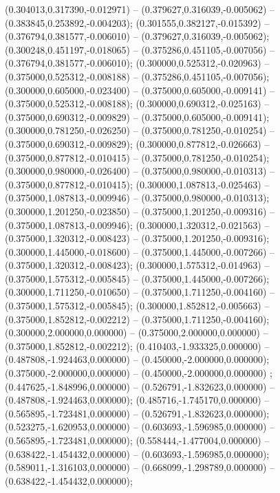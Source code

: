  (0.304013,0.317390,-0.012971) -- (0.379627,0.316039,-0.005062) -- (0.383845,0.253892,-0.004203);
 (0.301555,0.382127,-0.015392) -- (0.376794,0.381577,-0.006010) -- (0.379627,0.316039,-0.005062);
 (0.300248,0.451197,-0.018065) -- (0.375286,0.451105,-0.007056) -- (0.376794,0.381577,-0.006010);
 (0.300000,0.525312,-0.020963) -- (0.375000,0.525312,-0.008188) -- (0.375286,0.451105,-0.007056);
 (0.300000,0.605000,-0.023400) -- (0.375000,0.605000,-0.009141) -- (0.375000,0.525312,-0.008188);
 (0.300000,0.690312,-0.025163) -- (0.375000,0.690312,-0.009829) -- (0.375000,0.605000,-0.009141);
 (0.300000,0.781250,-0.026250) -- (0.375000,0.781250,-0.010254) -- (0.375000,0.690312,-0.009829);
 (0.300000,0.877812,-0.026663) -- (0.375000,0.877812,-0.010415) -- (0.375000,0.781250,-0.010254);
 (0.300000,0.980000,-0.026400) -- (0.375000,0.980000,-0.010313) -- (0.375000,0.877812,-0.010415);
 (0.300000,1.087813,-0.025463) -- (0.375000,1.087813,-0.009946) -- (0.375000,0.980000,-0.010313);
 (0.300000,1.201250,-0.023850) -- (0.375000,1.201250,-0.009316) -- (0.375000,1.087813,-0.009946);
 (0.300000,1.320312,-0.021563) -- (0.375000,1.320312,-0.008423) -- (0.375000,1.201250,-0.009316);
 (0.300000,1.445000,-0.018600) -- (0.375000,1.445000,-0.007266) -- (0.375000,1.320312,-0.008423);
 (0.300000,1.575312,-0.014963) -- (0.375000,1.575312,-0.005845) -- (0.375000,1.445000,-0.007266);
 (0.300000,1.711250,-0.010650) -- (0.375000,1.711250,-0.004160) -- (0.375000,1.575312,-0.005845);
 (0.300000,1.852812,-0.005663) -- (0.375000,1.852812,-0.002212) -- (0.375000,1.711250,-0.004160);
 (0.300000,2.000000,0.000000) -- (0.375000,2.000000,0.000000) -- (0.375000,1.852812,-0.002212);
 (0.410403,-1.933325,0.000000) -- (0.487808,-1.924463,0.000000) -- (0.450000,-2.000000,0.000000);
 (0.375000,-2.000000,0.000000) -- (0.450000,-2.000000,0.000000) ;
 (0.447625,-1.848996,0.000000) -- (0.526791,-1.832623,0.000000) -- (0.487808,-1.924463,0.000000);
 (0.485716,-1.745170,0.000000) -- (0.565895,-1.723481,0.000000) -- (0.526791,-1.832623,0.000000);
 (0.523275,-1.620953,0.000000) -- (0.603693,-1.596985,0.000000) -- (0.565895,-1.723481,0.000000);
 (0.558444,-1.477004,0.000000) -- (0.638422,-1.454432,0.000000) -- (0.603693,-1.596985,0.000000);
 (0.589011,-1.316103,0.000000) -- (0.668099,-1.298789,0.000000) -- (0.638422,-1.454432,0.000000);
